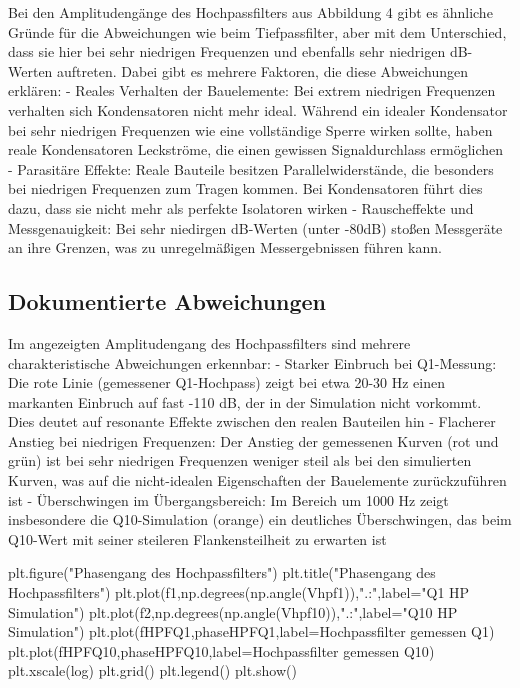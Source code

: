 \documentclass[
  ngerman,
  letterpaper,
  DIV=11]{scrreprt}
\newenvironment{Shaded}{}{}
\newcommand{\NormalTok}[1]{\textcolor[rgb]{0.14,0.16,0.18}{#1}}
\newcommand{\OperatorTok}[1]{\textcolor[rgb]{0.14,0.16,0.18}{#1}}
\newcommand{\StringTok}[1]{\textcolor[rgb]{0.01,0.18,0.38}{#1}}
\begin{document}
Bei den Amplitudengänge des Hochpassfilters aus Abbildung 4 gibt es
ähnliche Gründe für die Abweichungen wie beim Tiefpassfilter, aber mit
dem Unterschied, dass sie hier bei sehr niedrigen Frequenzen und
ebenfalls sehr niedrigen dB-Werten auftreten. Dabei gibt es mehrere
Faktoren, die diese Abweichungen erklären: - Reales Verhalten der
Bauelemente: Bei extrem niedrigen Frequenzen verhalten sich
Kondensatoren nicht mehr ideal. Während ein idealer Kondensator bei sehr
niedrigen Frequenzen wie eine vollständige Sperre wirken sollte, haben
reale Kondensatoren Leckströme, die einen gewissen Signaldurchlass
ermöglichen - Parasitäre Effekte: Reale Bauteile besitzen
Parallelwiderstände, die besonders bei niedrigen Frequenzen zum Tragen
kommen. Bei Kondensatoren führt dies dazu, dass sie nicht mehr als
perfekte Isolatoren wirken - Rauscheffekte und Messgenauigkeit: Bei sehr
niedirgen dB-Werten (unter -80dB) stoßen Messgeräte an ihre Grenzen, was
zu unregelmäßigen Messergebnissen führen kann.

\subsection{Dokumentierte
Abweichungen}\label{dokumentierte-abweichungen-1}

Im angezeigten Amplitudengang des Hochpassfilters sind mehrere
charakteristische Abweichungen erkennbar: - Starker Einbruch bei
Q1-Messung: Die rote Linie (gemessener Q1-Hochpass) zeigt bei etwa 20-30
Hz einen markanten Einbruch auf fast -110 dB, der in der Simulation
nicht vorkommt. Dies deutet auf resonante Effekte zwischen den realen
Bauteilen hin - Flacherer Anstieg bei niedrigen Frequenzen: Der Anstieg
der gemessenen Kurven (rot und grün) ist bei sehr niedrigen Frequenzen
weniger steil als bei den simulierten Kurven, was auf die nicht-idealen
Eigenschaften der Bauelemente zurückzuführen ist - Überschwingen im
Übergangsbereich: Im Bereich um 1000 Hz zeigt insbesondere die
Q10-Simulation (orange) ein deutliches Überschwingen, das beim Q10-Wert
mit seiner steileren Flankensteilheit zu erwarten ist

\begin{Shaded}
\begin{Highlighting}[]
\NormalTok{plt.figure(}\StringTok{"Phasengang des Hochpassfilters"}\NormalTok{)}
\NormalTok{plt.title(}\StringTok{"Phasengang des Hochpassfilters"}\NormalTok{)}
\NormalTok{plt.plot(f1,np.degrees(np.angle(Vhpf1)),}\StringTok{".:"}\NormalTok{,label}\OperatorTok{=}\StringTok{"Q1 HP Simulation"}\NormalTok{)}
\NormalTok{plt.plot(f2,np.degrees(np.angle(Vhpf10)),}\StringTok{".:"}\NormalTok{,label}\OperatorTok{=}\StringTok{"Q10 HP Simulation"}\NormalTok{)}
\NormalTok{plt.plot(fHPFQ1,phaseHPFQ1,label}\OperatorTok{=}\StringTok{\textquotesingle{}Hochpassfilter gemessen Q1\textquotesingle{}}\NormalTok{)}
\NormalTok{plt.plot(fHPFQ10,phaseHPFQ10,label}\OperatorTok{=}\StringTok{\textquotesingle{}Hochpassfilter gemessen Q10\textquotesingle{}}\NormalTok{)}
\NormalTok{plt.xscale(}\StringTok{\textquotesingle{}log\textquotesingle{}}\NormalTok{)}
\NormalTok{plt.grid()}
\NormalTok{plt.legend()}
\NormalTok{plt.show()}
\end{Highlighting}
\end{Shaded}
\end{document}
